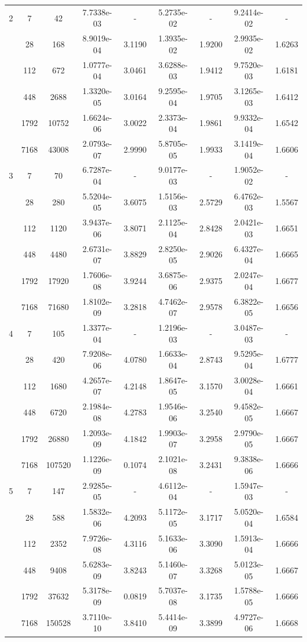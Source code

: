 \begin{longtable}{| c | c c | c c | c c | c c |}
	\hline

	2	& 7 & 42 & 7.7338e-03 & - & 5.2735e-02 & - & 9.2414e-02 & - \\
		& 28 & 168 & 8.9019e-04 & 3.1190 & 1.3935e-02 & 1.9200 & 2.9935e-02 & 1.6263 \\
		& 112 & 672 & 1.0777e-04 & 3.0461 & 3.6288e-03 & 1.9412 & 9.7520e-03 & 1.6181 \\
		& 448 & 2688 & 1.3320e-05 & 3.0164 & 9.2595e-04 & 1.9705 & 3.1265e-03 & 1.6412 \\
		& 1792 & 10752 & 1.6624e-06 & 3.0022 & 2.3373e-04 & 1.9861 & 9.9332e-04 & 1.6542 \\
		& 7168 & 43008 & 2.0793e-07 & 2.9990 & 5.8705e-05 & 1.9933 & 3.1419e-04 & 1.6606 \\

	\hline

	3	& 7 & 70 & 6.7287e-04 & - & 9.0177e-03 & - & 1.9052e-02 & - \\
		& 28 & 280 & 5.5204e-05 & 3.6075 & 1.5156e-03 & 2.5729 & 6.4762e-03 & 1.5567 \\
		& 112 & 1120 & 3.9437e-06 & 3.8071 & 2.1125e-04 & 2.8428 & 2.0421e-03 & 1.6651 \\
		& 448 & 4480 & 2.6731e-07 & 3.8829 & 2.8250e-05 & 2.9026 & 6.4327e-04 & 1.6665 \\
		& 1792 & 17920 & 1.7606e-08 & 3.9244 & 3.6875e-06 & 2.9375 & 2.0247e-04 & 1.6677 \\
		& 7168 & 71680 & 1.8102e-09 & 3.2818 & 4.7462e-07 & 2.9578 & 6.3822e-05 & 1.6656 \\

	\hline

	4	& 7 & 105 & 1.3377e-04 & - & 1.2196e-03 & - & 3.0487e-03 & - \\
		& 28 & 420 & 7.9208e-06 & 4.0780 & 1.6633e-04 & 2.8743 & 9.5295e-04 & 1.6777 \\
		& 112 & 1680 & 4.2657e-07 & 4.2148 & 1.8647e-05 & 3.1570 & 3.0028e-04 & 1.6661 \\
		& 448 & 6720 & 2.1984e-08 & 4.2783 & 1.9546e-06 & 3.2540 & 9.4582e-05 & 1.6667 \\
		& 1792 & 26880 & 1.2093e-09 & 4.1842 & 1.9903e-07 & 3.2958 & 2.9790e-05 & 1.6667 \\
		& 7168 & 107520 & 1.1226e-09 & 0.1074 & 2.1021e-08 & 3.2431 & 9.3838e-06 & 1.6666 \\

	\hline

	5	& 7 & 147 & 2.9285e-05 & - & 4.6112e-04 & - & 1.5947e-03 & - \\
		& 28 & 588 & 1.5832e-06 & 4.2093 & 5.1172e-05 & 3.1717 & 5.0520e-04 & 1.6584 \\
		& 112 & 2352 & 7.9726e-08 & 4.3116 & 5.1633e-06 & 3.3090 & 1.5913e-04 & 1.6666 \\
		& 448 & 9408 & 5.6283e-09 & 3.8243 & 5.1460e-07 & 3.3268 & 5.0123e-05 & 1.6667 \\
		& 1792 & 37632 & 5.3178e-09 & 0.0819 & 5.7037e-08 & 3.1735 & 1.5788e-05 & 1.6666 \\
		& 7168 & 150528 & 3.7110e-10 & 3.8410 & 5.4414e-09 & 3.3899 & 4.9727e-06 & 1.6668 \\
	

\end{longtable}
